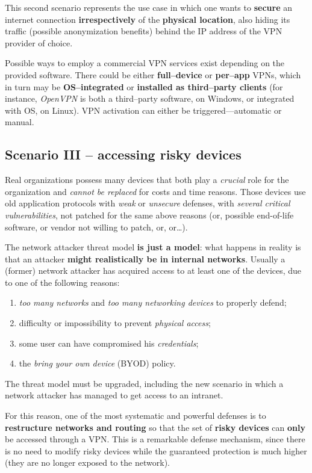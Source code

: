 \documentclass[10pt]{extbook}
\begin{document}
This second scenario represents the use case in which one wants to
\textbf{secure} an internet connection \textbf{irrespectively} of the
\textbf{physical location}, also hiding its traffic (possible anonymization
benefits) behind the IP address of the VPN provider of choice.

Possible ways to employ a commercial VPN services exist depending on the
provided software. There could be either \textbf{full--device} or
\textbf{per--app} VPNs, which in turn may be \textbf{OS--integrated} or
\textbf{installed as third--party clients} (for instance, \emph{OpenVPN} is
both a third--party software, on Windows, or integrated with OS, on Linux). VPN
activation can either be triggered---automatic or manual.

\subsection{Scenario III -- accessing risky devices}

Real organizations possess many devices that both play a \emph{crucial} role
for the organization and \emph{cannot be replaced} for costs and time reasons.
Those devices use old application protocols with \emph{weak} or \emph{unsecure}
defenses, with \emph{several critical vulnerabilities}, not patched for the
same above reasons (or, possible end-of-life software, or vendor not willing to
patch, or, or\dots).

The network attacker threat model \textbf{is just a model}: what happens in
reality is that an attacker \textbf{might realistically be in internal
networks}. Usually a (former) network attacker has acquired access to at least
one of the devices, due to one of the following reasons:
\begin{enumerate}
    \item \emph{too many networks} and \emph{too many networking devices} to
        properly defend;
    \item difficulty or impossibility to prevent \emph{physical access};
    \item some user can have compromised his \emph{credentials};
    \item the \emph{bring your own device} (BYOD) policy.
\end{enumerate}

The threat model must be upgraded, including the new scenario in which a
network attacker has managed to get access to an intranet.

For this reason, one of the most systematic and powerful defenses is to
\textbf{restructure networks and routing} so that the set of \textbf{risky
devices} can \textbf{only} be accessed through a VPN. This is a remarkable
defense mechanism, since there is no need to modify risky devices while the
guaranteed protection is much higher (they are no longer exposed to the
network).
\end{document}
